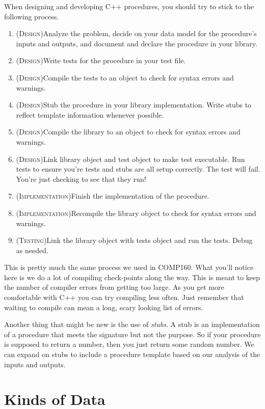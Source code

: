 \documentclass[]{tufte-handout}
\begin{document}
When designing and developing C++ procedures, you should try to stick to the following process.
\begin{enumerate}
\item (\textsc{Design})Analyze the problem, decide on your data model for the procedure's inputs and outputs, and document and declare the procedure in your library.
\item (\textsc{Design})Write tests for the procedure in your test file. 
\item (\textsc{Design})Compile the tests to an object to check for syntax errors and warnings.  
\item (\textsc{Design})Stub the procedure in your library implementation. Write stubs to reflect template information whenever possible.
\item (\textsc{Design})Compile the library to an object to check for syntax errors and warnings. 
\item (\textsc{Design})Link library object and test object to make test executable. Run tests to ensure you're tests and stubs are all setup correctly. The test will fail. You're just checking to see that they run!
\item (\textsc{Implementation})Finish the implementation of the procedure. 
\item (\textsc{Implementation})Recompile the library object to check for syntax errors and warnings.
\item (\textsc{Testing})Link the library object with tests object and run the tests. Debug as needed.
\end{enumerate}
This is pretty much the same process we used in COMP160.  What you'll notice here is we do a lot of compiling check-points along the way. This is meant to keep the number of compiler errors from getting too large. As you get more comfortable with C++ you can try compiling less often. Just remember that waiting to compile can mean a long, scary looking list of errors.

Another thing that might be new is the use of \textit{stubs}. A stub is an implementation of a procedure that meets the signature but not the purpose. So if your procedure is supposed to return a number, then you just return some random number. We can expand on stubs to include a procedure template based on our analysis of the inputs and outputs.   

\section{Kinds of Data}
\end{document}
